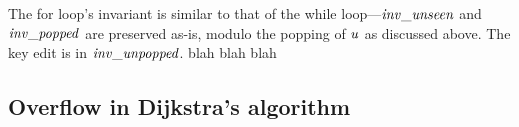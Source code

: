 {The for loop's invariant is similar to that of the while loop---$\mathit{inv\_unseen}$
and $\mathit{inv\_popped}$ are preserved as-is, modulo the popping of
$\mathit{u}$ as discussed above. The key edit is in $\mathit{inv\_unpopped}$. blah blah blah

}

\subsection{Overflow in Dijkstra's algorithm}
\label{sec:dijkoverflow}





